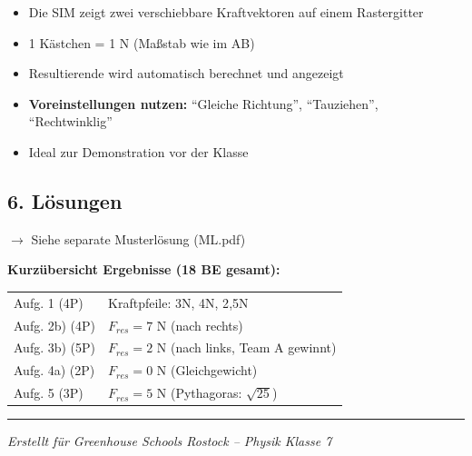 \documentclass[a4paper,11pt]{article}
\begin{document}
\begin{itemize}[nosep]
\item Die SIM zeigt zwei verschiebbare Kraftvektoren auf einem Rastergitter
\item 1 Kästchen = 1 N (Maßstab wie im AB)
\item Resultierende wird automatisch berechnet und angezeigt
\item \textbf{Voreinstellungen nutzen:} ``Gleiche Richtung'', ``Tauziehen'', ``Rechtwinklig''
\item Ideal zur Demonstration vor der Klasse
\end{itemize}

\vspace{0.5cm}

\subsection*{6. Lösungen}

$\rightarrow$ Siehe separate Musterlösung (ML.pdf)

\vspace{0.3cm}

\textbf{Kurzübersicht Ergebnisse (18 BE gesamt):}

\begin{tabular}{ll}
Aufg. 1 (4P) & Kraftpfeile: 3N, 4N, 2{,}5N \\
Aufg. 2b) (4P) & $F_{res} = 7$ N (nach rechts) \\
Aufg. 3b) (5P) & $F_{res} = 2$ N (nach links, Team A gewinnt) \\
Aufg. 4a) (2P) & $F_{res} = 0$ N (Gleichgewicht) \\
Aufg. 5 (3P) & $F_{res} = 5$ N (Pythagoras: $\sqrt{25}$) \\
\end{tabular}

\vspace{0.5cm}

\hrule
\vspace{0.3cm}
\textit{Erstellt für Greenhouse Schools Rostock -- Physik Klasse 7}
\end{document}
